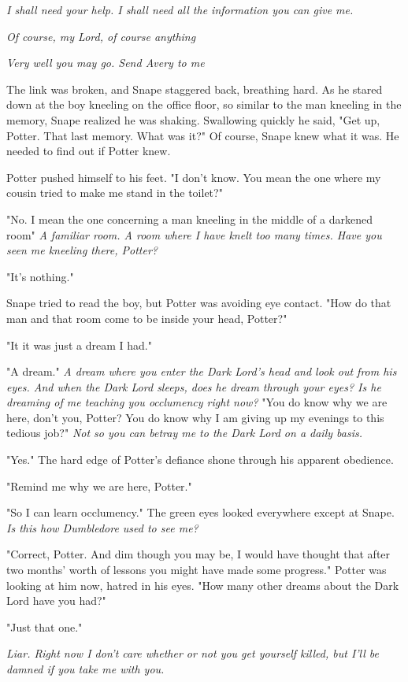\emph{I shall need your help. I shall need all the information you can give me.}

\emph{Of course, my Lord, of course{\el} anything{\el}}

\emph{Very well{\el} you may go. Send Avery to me{\el}}

The link was broken, and Snape staggered back, breathing hard. As he stared down at the boy kneeling on the office floor, so similar to the man kneeling in the memory, Snape realized he was shaking. Swallowing quickly he said, "Get up, Potter. That last memory. What was it?" Of course, Snape knew what it was. He needed to find out if Potter knew.

Potter pushed himself to his feet. "I don't know. You mean the one where my cousin tried to make me stand in the toilet?"

"No. I mean the one concerning a man kneeling in the middle of a darkened room{\el}" \emph{A familiar room. A room where I have knelt too many times. Have you seen me kneeling there, Potter?}

"It's{\el} nothing."

Snape tried to read the boy, but Potter was avoiding eye contact. "How do that man and that room come to be inside your head, Potter?"

"It{\el} it was{\el} just a dream I had."

"A dream." \emph{A dream where you enter the Dark Lord's head and look out from his eyes. And when the Dark Lord sleeps, does he dream through your eyes? Is he dreaming of me teaching you occlumency right now?} "You do know why we are here, don't you, Potter? You do know why I am giving up my evenings to this tedious job?" \emph{Not so you can betray me to the Dark Lord on a daily basis.}

"Yes." The hard edge of Potter's defiance shone through his apparent obedience.

"Remind me why we are here, Potter."

"So I can learn occlumency." The green eyes looked everywhere except at Snape. \emph{Is this how Dumbledore used to see me?}

"Correct, Potter. And dim though you may be, I would have thought that after two months' worth of lessons you might have made some progress." Potter was looking at him now, hatred in his eyes. "How many other dreams about the Dark Lord have you had?"

"Just that one."

\emph{Liar. Right now I don't care whether or not you get yourself killed, but I'll be damned if you take me with you.}

